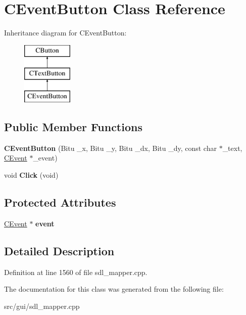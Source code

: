 \hypertarget{classCEventButton}{\section{C\-Event\-Button Class Reference}
\label{classCEventButton}
}
Inheritance diagram for C\-Event\-Button\-:\begin{figure}[H]
\begin{center}
\leavevmode
\includegraphics[height=3.000000cm]{classCEventButton}
\end{center}
\end{figure}
\subsection*{Public Member Functions}
\begin{DoxyCompactItemize}
\item 
\hypertarget{classCEventButton_a79fd3e96e7f7f1b3c4565f02535c3429}{{\bfseries C\-Event\-Button} (Bitu \-\_\-x, Bitu \-\_\-y, Bitu \-\_\-dx, Bitu \-\_\-dy, const char $\ast$\-\_\-text, \hyperlink{classCEvent}{C\-Event} $\ast$\-\_\-event)}\label{classCEventButton_a79fd3e96e7f7f1b3c4565f02535c3429}

\item 
\hypertarget{classCEventButton_ab88a51cd41e89b95cc7fbb7d78562fbe}{void {\bfseries Click} (void)}\label{classCEventButton_ab88a51cd41e89b95cc7fbb7d78562fbe}

\end{DoxyCompactItemize}
\subsection*{Protected Attributes}
\begin{DoxyCompactItemize}
\item 
\hypertarget{classCEventButton_a5f0d42f7b82112c4b144f84f308f1527}{\hyperlink{classCEvent}{C\-Event} $\ast$ {\bfseries event}}\label{classCEventButton_a5f0d42f7b82112c4b144f84f308f1527}

\end{DoxyCompactItemize}


\subsection{Detailed Description}


Definition at line 1560 of file sdl\-\_\-mapper.\-cpp.



The documentation for this class was generated from the following file\-:\begin{DoxyCompactItemize}
\item 
src/gui/sdl\-\_\-mapper.\-cpp\end{DoxyCompactItemize}
